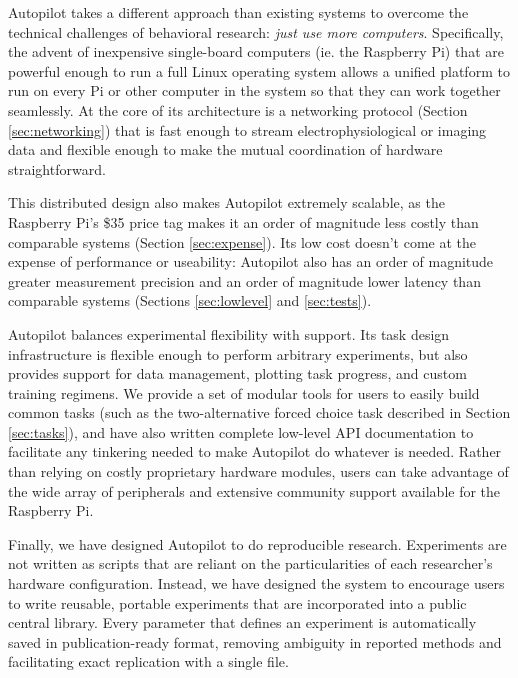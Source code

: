 Autopilot takes a different approach than existing systems to overcome the technical challenges of behavioral research: \textit{just use more computers}. Specifically, the advent of inexpensive single-board computers (ie. the Raspberry Pi) that are powerful enough to run a full Linux operating system allows a unified platform to run on every Pi or other computer in the system so that they can work together seamlessly. At the core of its architecture is a networking protocol (Section \ref{sec:networking}) that is fast enough to stream electrophysiological or imaging data and flexible enough to make the mutual coordination of hardware straightforward. 

This distributed design also makes Autopilot extremely scalable, as the Raspberry Pi's \$35 price tag makes it an order of magnitude less costly than comparable systems (Section \ref{sec:expense}). Its low cost doesn't come at the expense of performance or useability: Autopilot also has an order of magnitude greater measurement precision and an order of magnitude lower latency than comparable systems (Sections \ref{sec:lowlevel} and \ref{sec:tests}).

Autopilot balances experimental flexibility with support. Its task design infrastructure is flexible enough to perform arbitrary experiments, but also provides support for data management, plotting task progress, and custom training regimens. We provide a set of modular tools for users to easily build common tasks (such as the two-alternative forced choice task described in Section \ref{sec:tasks}), and have also written complete low-level API documentation to facilitate any tinkering needed to make Autopilot do whatever is needed. Rather than relying on costly proprietary hardware modules, users can take advantage of the wide array of peripherals and extensive community support available for the Raspberry Pi. 

Finally, we have designed Autopilot to do reproducible research. Experiments are not written as scripts that are reliant on the particularities of each researcher's hardware configuration. Instead, we have designed the system to encourage users to write reusable, portable experiments that are incorporated into a public central library. Every parameter that defines an experiment is automatically saved in  publication-ready format, removing ambiguity in reported methods and facilitating exact replication with a single file.

\vspace{12pt}


